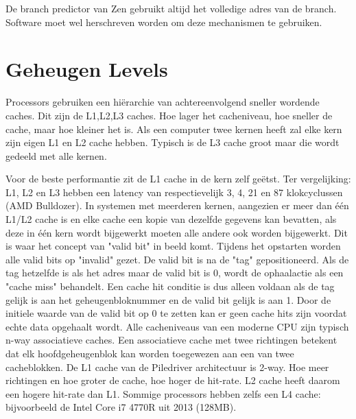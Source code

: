  De branch predictor van Zen gebruikt altijd het volledige adres van de branch.
Software moet wel herschreven worden om deze mechanismen te gebruiken.

\parencite{Intel2018}

\section{Geheugen Levels}
Processors gebruiken een hiërarchie van achtereenvolgend sneller wordende caches. Dit zijn de L1,L2,L3 caches.
Hoe lager het cacheniveau, hoe sneller de cache, maar hoe kleiner het is. Als een computer twee kernen heeft zal elke kern zijn eigen L1 en L2 cache hebben. Typisch is de L3 cache groot maar die wordt gedeeld met alle kernen.

 Voor de beste performantie zit de L1 cache in de kern zelf geëtst.
 Ter vergelijking: L1, L2 en L3 hebben een latency van respectievelijk 3, 4, 21 en 87 klokcyclussen (AMD Bulldozer).
 In systemen met meerderen kernen, aangezien er meer dan één L1/L2 cache is en elke cache een kopie van dezelfde gegevens kan bevatten, als deze in één kern wordt bijgewerkt moeten alle andere ook worden bijgewerkt.
 Dit is waar het concept van "valid bit" in beeld komt.
 Tijdens het opstarten worden alle valid bits op "invalid" gezet. De valid bit is na de "tag" gepositioneerd.
 Als de tag hetzelfde is als het adres maar de valid bit is 0, wordt de ophaalactie als een "cache miss" behandelt.
 Een cache hit conditie is dus alleen voldaan als de tag gelijk is aan het geheugenbloknummer en de valid bit gelijk is aan 1. Door de initiele waarde van de valid bit op 0 te zetten kan er geen cache hits zijn voordat echte data opgehaalt wordt.
Alle cacheniveaus van een moderne CPU zijn typisch n-way associatieve caches. Een associatieve cache met twee richtingen betekent dat elk hoofdgeheugenblok kan worden toegewezen aan een van twee cacheblokken. De L1 cache van de Piledriver architectuur is 2-way.\parencite{Hruska2017}
Hoe meer richtingen en hoe groter de cache, hoe hoger de hit-rate. L2 cache heeft daarom een hogere hit-rate dan L1.
Sommige processors hebben zelfs een L4 cache: bijvoorbeeld de Intel Core i7 4770R uit 2013 (128MB).


